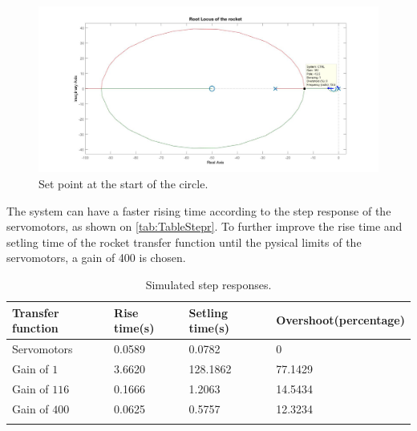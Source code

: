 \begin{figure}[htbp]
	\centering
	
	\includegraphics[width=\textwidth]{figures/Rocket/design/tf_with_controller_1_zoom_v2}
	\caption{Set point at the start of the circle.}
	\label{fig:SystemC1C2Zoom}
	
\end{figure}

The system can have a faster rising time according to the step response of the servomotors, as shown on \autoref{tab:TableStepr}. To further improve the rise time and setling time of the rocket transfer function until the pysical limits of the servomotors, a gain of 400 is chosen. 

\begin{table}[htbp]
	\centering
	\caption{Simulated step responses.}
	\label{tab:TableStepr}
	\begin{tabular}{llll}
		Transfer function & Rise time{(}s{)} & Setling time{(}s{)} & Overshoot{(}percentage{)} \\ \hline  \rowcolor{lightGrey}
		Servomotors     & 0.0589 & 0.0782 & 0\\  
		Gain of $1$     & 3.6620 & 128.1862 & 77.1429  \\  
		\rowcolor{lightGrey}           
		Gain of $116$     & 0.1666 & 1.2063 & 14.5434  \\
		Gain of $400$     & 0.0625 & 0.5757 & 12.3234      \\  
		\rowcolor{lightGrey}     
	\end{tabular}
\end{table}

